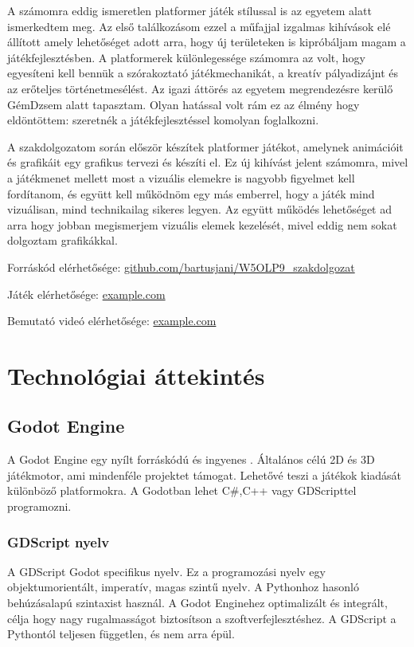 \documentclass[
]{thesis-ekf}
\theoremstyle{definition}
\theoremstyle{remark}
\begin{document}
A számomra eddig ismeretlen platformer játék stílussal is az egyetem alatt ismerkedtem meg. Az első találkozásom ezzel a műfajjal izgalmas kihívások elé állított amely lehetőséget adott arra, hogy új területeken is kipróbáljam magam a játékfejlesztésben. A platformerek különlegessége számomra az volt, hogy egyesíteni kell bennük a szórakoztató játékmechanikát, a kreatív pályadizájnt és az erőteljes történetmesélést. Az igazi áttörés az egyetem megrendezésre kerülő GémDzsem alatt tapasztam. Olyan hatással volt rám ez az élmény hogy eldöntöttem: szeretnék a játékfejlesztéssel komolyan foglalkozni.

A szakdolgozatom során először készítek platformer játékot, amelynek animációit és grafikáit  egy grafikus tervezi és készíti el. Ez új kihívást jelent számomra, mivel a játékmenet mellett most a vizuális elemekre is nagyobb figyelmet kell fordítanom, és együtt kell működnöm egy más emberrel, hogy a játék mind vizuálisan, mind technikailag sikeres legyen. Az együtt működés lehetőséget ad arra hogy jobban megismerjem vizuális elemek kezelését, mivel eddig nem sokat dolgoztam grafikákkal.

Forráskód elérhetősége: \href{https://github.com/bartusjani/W5OLP9_szakdolgozat}{github.com/bartusjani/W5OLP9\_szakdolgozat}

Játék elérhetősége: \href{https://example.com}{example.com}

Bemutató videó elérhetősége: \href{https://example.com}{example.com}


\chapter{Technológiai áttekintés}

\section{Godot Engine}

A Godot Engine egy nyílt forráskódú és ingyenes . Általános célú 2D és 3D játékmotor, ami mindenféle projektet támogat. Lehetővé teszi a játékok kiadását különböző platformokra. A Godotban lehet C\#,C++ vagy GDScripttel programozni.
\subsection{GDScript nyelv}
A GDScript Godot specifikus nyelv. Ez a programozási nyelv egy objektumorientált, imperatív, magas szintű nyelv. A Pythonhoz hasonló behúzásalapú szintaxist használ. A Godot Enginehez optimalizált és integrált, célja hogy nagy rugalmasságot biztosítson a szoftverfejlesztéshez. A GDScript a Pythontól  teljesen független, és nem arra épül.
\end{document}

